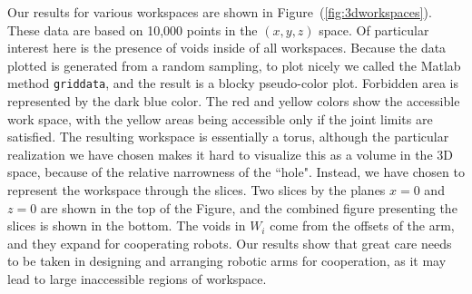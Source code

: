 \documentclass[12pt]{report}
\begin{document}
Our results for  various workspaces are shown  in Figure~(\ref{fig:3dworkspaces}).  These data are based on 10,000 points in the $(x,y,z)$ space.  Of particular interest here is  the presence of  voids inside of all  workspaces.   Because the data plotted is generated from a random sampling, to plot nicely we called the Matlab method \texttt{griddata}, and the result is a blocky pseudo-color plot.  Forbidden area is represented by the dark blue color. The red and yellow colors show the accessible work space, with the yellow areas being accessible only if the joint limits are satisfied. The resulting workspace is essentially a torus, although the particular realization we have chosen makes it hard to visualize this as a volume in the 3D space, because of the relative narrowness of the ``hole". Instead, we have chosen to represent the workspace through the slices. Two slices by the planes $x=0$ and $z=0$ are shown in the top of the Figure, and the combined figure presenting the slices is shown in the bottom. The voids in $W_i$ come from the offsets of the arm, and they expand  for cooperating robots. Our results show that great care needs to be taken in designing and arranging robotic arms for cooperation, as it may lead to large inaccessible regions of  workspace. 
\end{document}
